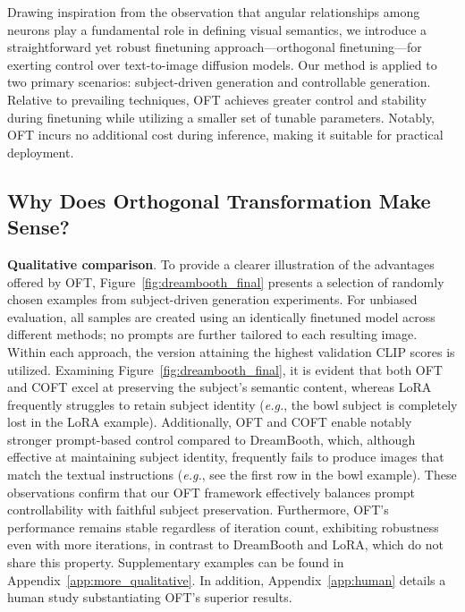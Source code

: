 Drawing inspiration from the observation that angular relationships among neurons play a fundamental role in defining visual semantics, we introduce a straightforward yet robust finetuning approach—orthogonal finetuning—for exerting control over text-to-image diffusion models. Our method is applied to two primary scenarios: subject-driven generation and controllable generation. Relative to prevailing techniques, OFT achieves greater control and stability during finetuning while utilizing a smaller set of tunable parameters. Notably, OFT incurs no additional cost during inference, making it suitable for practical deployment.

\subsection{Why Does Orthogonal Transformation Make Sense?}

\textbf{Qualitative comparison}. To provide a clearer illustration of the advantages offered by OFT, Figure~\ref{fig:dreambooth_final} presents a selection of randomly chosen examples from subject-driven generation experiments. For unbiased evaluation, all samples are created using an identically finetuned model across different methods; no prompts are further tailored to each resulting image. Within each approach, the version attaining the highest validation CLIP scores is utilized. Examining Figure~\ref{fig:dreambooth_final}, it is evident that both OFT and COFT excel at preserving the subject's semantic content, whereas LoRA frequently struggles to retain subject identity (\emph{e.g.}, the bowl subject is completely lost in the LoRA example). Additionally, OFT and COFT enable notably stronger prompt-based control compared to DreamBooth, which, although effective at maintaining subject identity, frequently fails to produce images that match the textual instructions (\emph{e.g.}, see the first row in the bowl example). These observations confirm that our OFT framework effectively balances prompt controllability with faithful subject preservation. Furthermore, OFT’s performance remains stable regardless of iteration count, exhibiting robustness even with more iterations, in contrast to DreamBooth and LoRA, which do not share this property. Supplementary examples can be found in Appendix~\ref{app:more_qualitative}. In addition, Appendix~\ref{app:human} details a human study substantiating OFT’s superior results.

